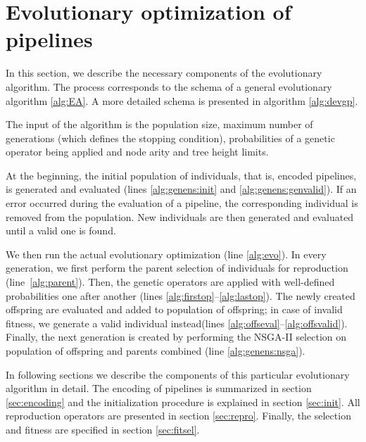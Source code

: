 \section{Evolutionary optimization of pipelines} \label{genens:devGP}
In this section, we describe the necessary components of the evolutionary algorithm.
The process corresponds to the schema of a general evolutionary algorithm
\ref{alg:EA}. A more detailed schema is presented in algorithm \ref{alg:devgp}.

The input of the algorithm is the population size, maximum number of
generations (which defines the stopping condition), probabilities of a genetic
operator being applied and node arity and tree height limits.

At the beginning, the initial population of individuals, that is, encoded pi\-pe\-li\-nes,
is generated and evaluated (lines \ref{alg:genens:init} and
\ref{alg:genens:genvalid}). If an error occurred during the evaluation of a
pipeline, the corresponding individual is removed from the population. New 
individuals are then generated and evaluated until a valid one is found.

We then run the actual evolutionary optimization (line \ref{alg:evo}).
In every generation, we first perform the parent selection of individuals for
reproduction (line~\ref{alg:parent}). Then, the genetic operators are applied
with well-defined
probabilities one after another (lines \ref{alg:firstop}--\ref{alg:lastop}).
The newly created offspring are evaluated and added
to population of offspring; in case of invalid fitness, we generate a
valid individual instead(lines \ref{alg:offseval}--\ref{alg:offsvalid}).
Finally, the next generation is created by
performing the NSGA-II selection on population of offspring and parents
combined (line \ref{alg:genens:nsga}).

In following sections we describe the components of this particular
evolutionary algorithm in detail. The encoding of pipelines is summarized in
section \ref{sec:encoding} and the initialization procedure is explained in
section \ref{sec:init}. All reproduction operators are presented in section
\ref{sec:repro}. Finally, the selection and fitness are specified in section
\ref{sec:fitsel}.


